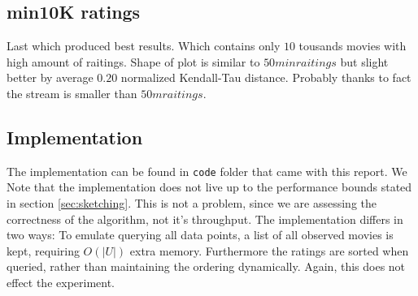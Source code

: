 \subsection{min10K ratings}
Last which produced best results. Which contains only $10$ tousands movies with high amount of raitings. Shape of plot is similar to 
$50min raitings$ but slight better by average $0.20$ normalized Kendall-Tau distance. Probably thanks to fact the stream is smaller than
$50m raitings$. 



\subsection{Implementation}
The implementation can be found in \texttt{code} folder that came with this
report. We Note that the implementation does not live up to the performance
bounds stated in section \ref{sec:sketching}. This is not a problem, since we
are assessing the correctness of the algorithm, not it's throughput. The
implementation differs in two ways: To emulate querying all data points, a list
of all observed movies is kept, requiring $O(|U|)$ extra memory. Furthermore the
ratings are sorted when queried, rather than maintaining the ordering
dynamically. Again, this does not effect the experiment.
